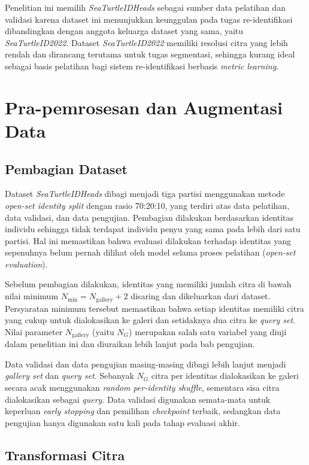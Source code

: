 Penelitian ini memilih \textit{SeaTurtleIDHeads} sebagai sumber data pelatihan dan validasi karena dataset ini menunjukkan keunggulan pada tugas re-identifikasi dibandingkan dengan anggota keluarga dataset yang sama, yaitu \textit{SeaTurtleID2022}. Dataset \textit{SeaTurtleID2022} memiliki resolusi citra yang lebih rendah dan dirancang terutama untuk tugas segmentasi, sehingga kurang ideal sebagai basis pelatihan bagi sistem re-identifikasi berbasis \textit{metric learning}.

\section{Pra-pemrosesan dan Augmentasi Data}
\subsection{Pembagian Dataset}

Dataset \textit{SeaTurtleIDHeads} dibagi menjadi tiga partisi menggunakan metode \textit{open-set identity split} dengan rasio 70:20:10, yang terdiri atas data pelatihan, data validasi, dan data pengujian. Pembagian dilakukan berdasarkan identitas individu sehingga tidak terdapat individu penyu yang sama pada lebih dari satu partisi. Hal ini memastikan bahwa evaluasi dilakukan terhadap identitas yang sepenuhnya belum pernah dilihat oleh model selama proses pelatihan (\textit{open-set evaluation}).

Sebelum pembagian dilakukan, identitas yang memiliki jumlah citra di bawah nilai minimum $N_{\min} = N_{\text{gallery}} + 2$ disaring dan dikeluarkan dari dataset. Persyaratan minimum tersebut memastikan bahwa setiap identitas memiliki citra yang cukup untuk dialokasikan ke galeri dan setidaknya dua citra ke \textit{query set}. Nilai parameter $N_{\text{gallery}}$ (yaitu $N_G$) merupakan salah satu variabel yang diuji dalam penelitian ini dan diuraikan lebih lanjut pada bab pengujian.

Data validasi dan data pengujian masing-masing dibagi lebih lanjut menjadi \textit{gallery set} dan \textit{query set}. Sebanyak $N_G$ citra per identitas dialokasikan ke galeri secara acak menggunakan \textit{random per-identity shuffle}, sementara sisa citra dialokasikan sebagai \textit{query}. Data validasi digunakan semata-mata untuk keperluan \textit{early stopping} dan pemilihan \textit{checkpoint} terbaik, sedangkan data pengujian hanya digunakan satu kali pada tahap evaluasi akhir.

\subsection{Transformasi Citra}

